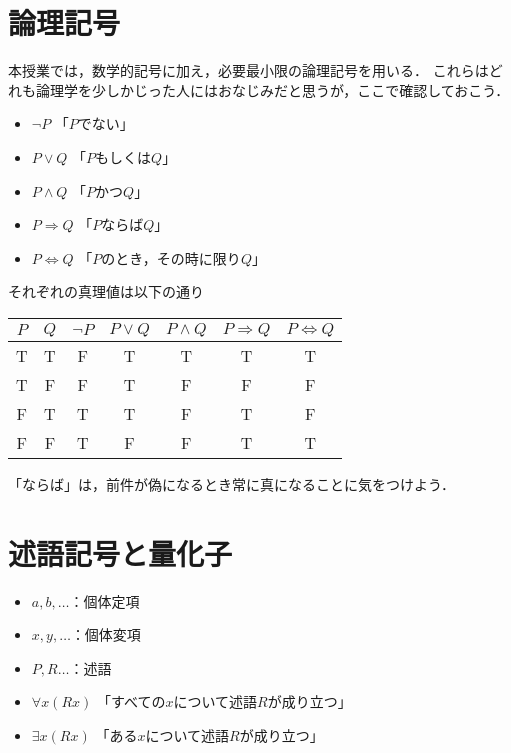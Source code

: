 \documentclass[11pt,a4paper]{jsarticle}
\begin{document}
\section{論理記号}
本授業では，数学的記号に加え，必要最小限の論理記号を用いる．
これらはどれも論理学を少しかじった人にはおなじみだと思うが，ここで確認しておこう．

\begin{itemize}
 \item $\neg P$ 「$P$でない」
 \item $P \vee Q$ 「$P$もしくは$Q$」
 \item $P \wedge Q$ 「$P$かつ$Q$」
 \item $P \Rightarrow Q$ 「$P$ならば$Q$」
 \item $P \iff Q$ 「$P$のとき，その時に限り$Q$」
\end{itemize}

それぞれの真理値は以下の通り

\begin{table}[h]
\centering
\begin{tabular}{cc|ccccc} \hline
 $P$ & $Q$ & $\neg P$ & $P \vee Q$ & $P \wedge Q$ & $P \Rightarrow Q$ & $P \iff Q$ \\ \hline 
 T  & T & F & T & T & T & T \\
 T  & F & F & T & F & F & F \\
 F  & T & T & T & F & T & F \\
 F  & F & T & F & F & T & T \\ \hline
\end{tabular} 
\end{table}

\begin{attn}
「ならば」は，前件が偽になるとき常に真になることに気をつけよう．
\end{attn}


\section{述語記号と量化子}
\begin{itemize}
 \item $a, b, \dots$：個体定項
 \item $x, y, \dots$：個体変項
 \item $P, R \dots$：述語
 \item $\forall x (Rx)$ 「すべての$x$について述語$R$が成り立つ」
 \item $\exists x (Rx)$ 「ある$x$について述語$R$が成り立つ」
\end{itemize}
\end{document}
